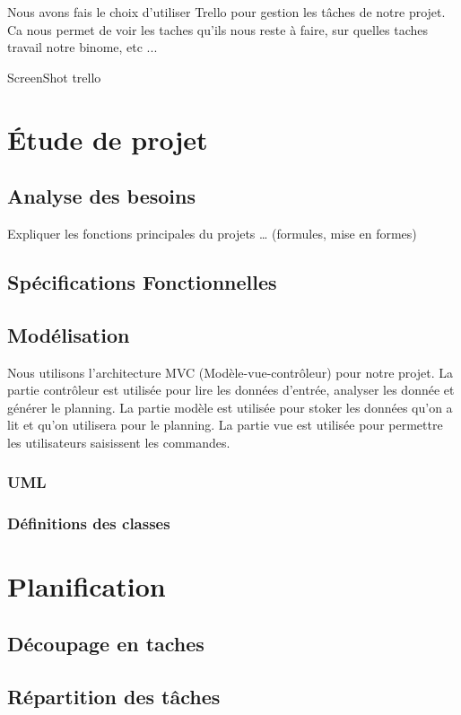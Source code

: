 \documentclass{polytech/polytech}
\begin{document}
	Nous avons fais le choix d'utiliser Trello pour gestion les tâches de notre projet.
	Ca nous permet de voir les taches qu'ils nous reste à faire, sur quelles taches travail notre binome, etc ...
	
	ScreenShot trello

	\chapter{Étude de projet}
	\section{Analyse des besoins}
	Expliquer les fonctions principales du projets … (formules, mise en formes)

	\section{Spécifications Fonctionnelles}

	\section{Modélisation}
	Nous utilisons l'architecture MVC (Modèle-vue-contrôleur) pour notre projet. La partie contrôleur est utilisée pour lire les données d'entrée, analyser les donnée et générer le planning. La partie modèle est utilisée pour stoker les données qu'on a lit et qu'on utilisera pour le planning. La partie vue est utilisée pour permettre les utilisateurs saisissent les commandes.

	\subsection{UML}

	\subsection{Définitions des classes}

	\chapter{Planification}

	\section{Découpage en taches}

	\section{Répartition des tâches}
\end{document}
